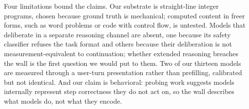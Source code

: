Four limitations bound the claims. Our substrate is straight-line integer programs, chosen because ground truth is mechanical; computed content in freer forms, such as word problems or code with control flow, is untested. Models that deliberate in a separate reasoning channel are absent, one because its safety classifier refuses the task format and others because their deliberation is not measurement-equivalent to continuation; whether extended reasoning breaches the wall is the first question we would put to them. Two of our thirteen models are measured through a user-turn presentation rather than prefilling, calibrated but not identical. And our claim is behavioral: probing work suggests models internally represent step correctness they do not act on, so the wall describes what models do, not what they encode.
